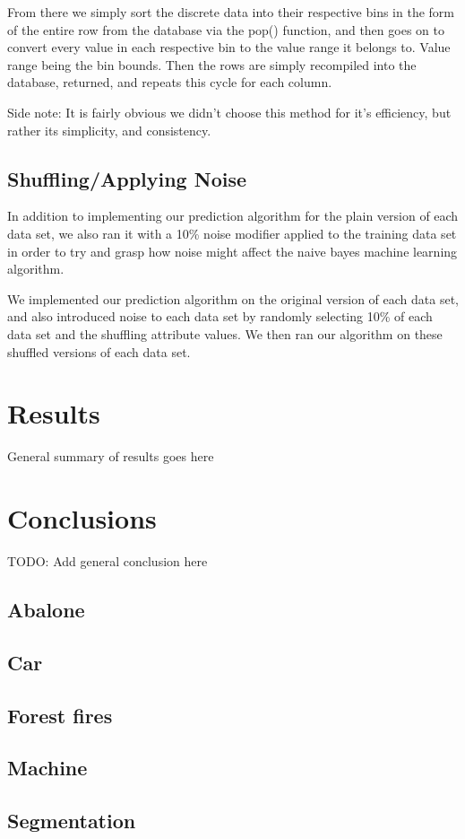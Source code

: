 \documentclass[twoside,11pt]{article}
\begin{document}
From there we simply sort the discrete data into their respective bins in the form of the entire row from the database via the pop() function, and then goes on to convert every value in each respective bin to the value range it belongs to. Value range being the bin bounds. Then the rows are simply recompiled into the database, returned, and repeats this cycle for each column.

Side note: It is fairly obvious we didn't choose this method for it’s efficiency, but rather its simplicity, and consistency.

\subsection{Shuffling/Applying Noise}

In addition to implementing our prediction algorithm for the plain version of each data set, we also ran it with a 10\% noise modifier applied to the training data set in order to try and grasp how noise might affect the naive bayes machine learning algorithm. 

We implemented our prediction algorithm on the original version of each data set, and also introduced noise to each data set by randomly selecting 10\% of each data set and the shuffling attribute values. We then ran our algorithm on these shuffled versions of each data set.

\section{Results}
General summary of results goes here

\section{Conclusions}

TODO: Add general conclusion here

\subsection{Abalone}

\subsection{Car}

\subsection{Forest fires}

\subsection{Machine}

\subsection{Segmentation}


\acks{}
\end{document}
